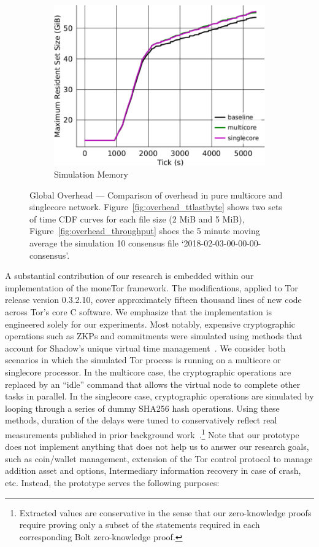 \begin{figure}[t]
\begin{subfigure}[t]{0.32\textwidth}
    \includegraphics[clip, width=1.0\textwidth]{images/overhead_memory.pdf}
    \caption{Simulation Memory}
    \label{fig:overhead_shadow}
  \end{subfigure}
  \caption{Global Overhead --- Comparison of overhead in pure multicore and singlecore network.
    Figure~\ref{fig:overhead_ttlastbyte} shows two sets of time CDF curves for each file size (2 MiB and 5 MiB), Figure~\ref{fig:overhead_throughput} shoes the 5 minute moving average the simulation 10 consensus file `2018-02-03-00-00-00-consensus'.}
  \label{fig:overhead}
\end{figure}

A substantial contribution of our research is embedded within our implementation of the moneTor framework.
The modifications, applied to Tor release version 0.3.2.10, cover
approximately fifteen thousand lines of new code across Tor's core C software.
We emphasize that the implementation is engineered solely for our experiments.
Most notably, expensive cryptographic operations such as ZKPs and commitments were simulated using methods that account for Shadow's unique virtual time management~\cite{jansen2011shadow}.
We consider both scenarios in which the simulated Tor process is running on a multicore or singlecore processor.
In the multicore case, the cryptographic operations are replaced by an ``idle'' command that allows the virtual node to complete other tasks in parallel.
In the singlecore case, cryptographic operations are simulated by looping through a series of dummy SHA256 hash operations.
Using these methods, duration of the delays were tuned to
conservatively reflect real measurements published in prior background work~\cite{green2017bolt}.\footnote{Extracted values are conservative in the sense that our zero-knowledge proofs require proving only a subset of the statements required in each corresponding Bolt zero-knowledge proof.}
Note that our prototype does not implement anything that does not help us to answer our research goals, such as coin/wallet management, extension of the Tor control protocol to manage addition asset and options, Intermediary information recovery in case of crash, etc.
Instead, the prototype serves the following purposes:

